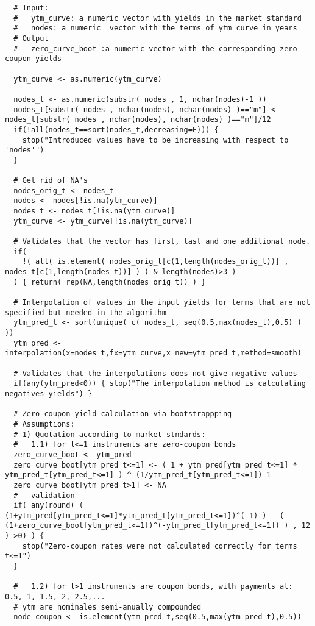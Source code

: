 \documentclass[letterpaper,10pt,english]{/anaconda/lib/python2.7/site-packages/sphinx/texinputs/sphinxhowto}
\begin{document}
\begin{verbatim}
  # Input:
  #   ytm_curve: a numeric vector with yields in the market standard
  #   nodes: a numeric  vector with the terms of ytm_curve in years
  # Output
  #   zero_curve_boot :a numeric vector with the corresponding zero-coupon yields
  
  ytm_curve <- as.numeric(ytm_curve)
  
  nodes_t <- as.numeric(substr( nodes , 1, nchar(nodes)-1 ))
  nodes_t[substr( nodes , nchar(nodes), nchar(nodes) )=="m"] <- nodes_t[substr( nodes , nchar(nodes), nchar(nodes) )=="m"]/12
  if(!all(nodes_t==sort(nodes_t,decreasing=F))) {
    stop("Introduced values have to be increasing with respect to 'nodes'")
  }
  
  # Get rid of NA's
  nodes_orig_t <- nodes_t
  nodes <- nodes[!is.na(ytm_curve)]
  nodes_t <- nodes_t[!is.na(ytm_curve)]
  ytm_curve <- ytm_curve[!is.na(ytm_curve)]
  
  # Validates that the vector has first, last and one additional node.
  if(
    !( all( is.element( nodes_orig_t[c(1,length(nodes_orig_t))] , nodes_t[c(1,length(nodes_t))] ) ) & length(nodes)>3 )
  ) { return( rep(NA,length(nodes_orig_t)) ) }
  
  # Interpolation of values in the input yields for terms that are not specified but needed in the algorithm
  ytm_pred_t <- sort(unique( c( nodes_t, seq(0.5,max(nodes_t),0.5) ) ))
  ytm_pred <- interpolation(x=nodes_t,fx=ytm_curve,x_new=ytm_pred_t,method=smooth)

  # Validates that the interpolations does not give negative values
  if(any(ytm_pred<0)) { stop("The interpolation method is calculating negatives yields") }
  
  # Zero-coupon yield calculation via bootstrappping
  # Assumptions:
  # 1) Quotation according to market stndards:
  #   1.1) for t<=1 instruments are zero-coupon bonds
  zero_curve_boot <- ytm_pred
  zero_curve_boot[ytm_pred_t<=1] <- ( 1 + ytm_pred[ytm_pred_t<=1] * ytm_pred_t[ytm_pred_t<=1] ) ^ (1/ytm_pred_t[ytm_pred_t<=1])-1
  zero_curve_boot[ytm_pred_t>1] <- NA
  #   validation
  if( any(round( ( (1+ytm_pred[ytm_pred_t<=1]*ytm_pred_t[ytm_pred_t<=1])^(-1) ) - ( (1+zero_curve_boot[ytm_pred_t<=1])^(-ytm_pred_t[ytm_pred_t<=1]) ) , 12 ) >0) ) {
    stop("Zero-coupon rates were not calculated correctly for terms t<=1")
  }
  
  #   1.2) for t>1 instruments are coupon bonds, with payments at: 0.5, 1, 1.5, 2, 2.5,...
  # ytm are nominales semi-anually compounded
  node_coupon <- is.element(ytm_pred_t,seq(0.5,max(ytm_pred_t),0.5))
  

\end{verbatim}
\end{document}
